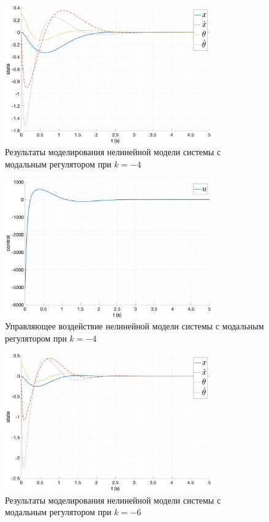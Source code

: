 \begin{figure}[ht!]
    \centering
    \includegraphics[width=0.8\textwidth]{media/plots/modal_controllers/state_1.png}
    \caption{Результаты моделирования нелинейной модели системы с модальным регулятором при $k = -4$}
    \label{fig:modal_controlers_1_out}
\end{figure}
\begin{figure}[ht!]
    \centering
    \includegraphics[width=0.8\textwidth]{media/plots/modal_controllers/u_1.png}
    \caption{Управляющее воздействие нелинейной модели системы с модальным регулятором при $k = -4$}
    \label{fig:modal_controlers_1_u}
\end{figure}
\begin{figure}[ht!]
    \centering
    \includegraphics[width=0.8\textwidth]{media/plots/modal_controllers/state_2.png}
    \caption{Результаты моделирования нелинейной модели системы с модальным регулятором при $k = -6$}
    \label{fig:modal_controlers_2_out}
\end{figure}
